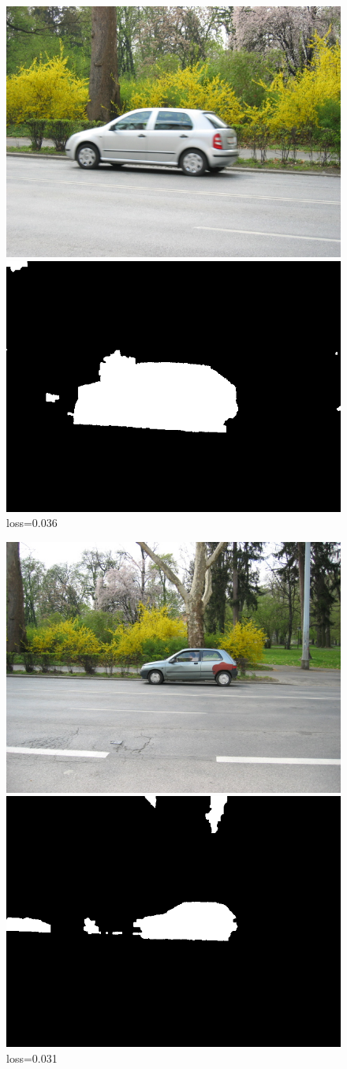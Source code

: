 \documentclass[russian,10pt,a4paper]{article}
\theoremstyle{definition}
\begin{document}
\begin{figure}[!h]
  \center
    \includegraphics[width=0.45\linewidth]{images/imgTrain_112}$ $
    \includegraphics[width=0.45\linewidth]{images/112_segm_res}
loss=0.036
\end{figure}



\begin{figure}[!h]
  \center
    \includegraphics[width=0.45\linewidth]{images/imgTrain_113}$ $
    \includegraphics[width=0.45\linewidth]{images/113_segm_res}
loss=0.031
\end{figure}
\end{document}
